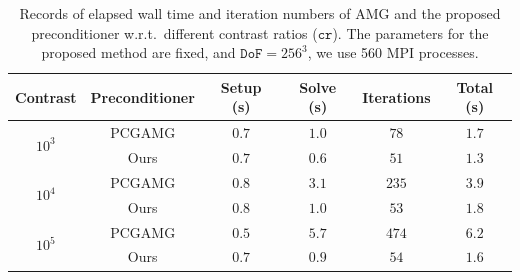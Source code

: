 \documentclass[preprint,12pt]{elsarticle}
\begin{document}
  \begin{table}
    [!ht] \footnotesize
    \caption{Records of elapsed wall time and iteration numbers of AMG and the
    proposed preconditioner w.r.t.\ different contrast ratios ($\mathtt{cr}$).
    The parameters for the proposed method are fixed, and $\mathtt{DoF}=256^{3}$,
    we use 560 MPI processes.}
    \label{tab:comparison_contrast_256}
    \begin{center}
      \makegapedcells
      \begin{tabular}{c c c c c c}
        \toprule Contrast                  & Preconditioner & Setup (s) & Solve (s) & Iterations & Total (s) \\
        \midrule \multirow{2}{*}{$10^{3}$} & PCGAMG         & $0.7$     & $1.0$     & $78$       & $1.7$     \\
                                           & Ours           & $0.7$     & $0.6$     & $51$       & $1.3$     \\
        \midrule \multirow{2}{*}{$10^{4}$} & PCGAMG         & $0.8$     & $3.1$     & $235$      & $3.9$     \\
                                           & Ours           & $0.8$     & $1.0$     & $53$       & $1.8$     \\
        \midrule \multirow{2}{*}{$10^{5}$} & PCGAMG         & $0.5$     & $5.7$     & $474$      & $6.2$     \\
                                           & Ours           & $0.7$     & $0.9$     & $54$       & $1.6$     \\
        \bottomrule
      \end{tabular}
    \end{center}
  \end{table}
\end{document}
